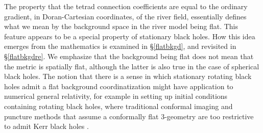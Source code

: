 \documentclass[twocolumn,showpacs,preprintnumbers,amsmath,amssymb,prb]{revtex4}
\begin{document}

The property
that the tetrad connection coefficients are equal to the ordinary gradient,
in Doran-Cartesian coordinates,
of the river field,
essentially defines what we mean by the background space
in the river model being flat.
This feature appears to be a special property of stationary black holes.
How this idea emerges from the mathematics is examined in
\S\ref{flatbkgd}, and revisited in \S\ref{flatbkgdre}.
We emphasize that the background being flat does not mean that
the metric is spatially flat,
although the latter is also true in the case of spherical black holes.
The notion that there is a sense in which stationary rotating black holes
admit a flat background coordinatization
might have application to numerical general relativity,
for example in setting up initial conditions containing rotating black holes,
where traditional conformal imaging and puncture methods that
assume a conformally flat 3-geometry are too restrictive to admit
Kerr black holes
\cite{Cook}.
\end{document}
